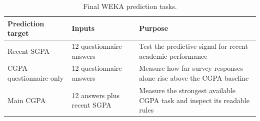 \begin{table}[H]\centering
\caption{Final WEKA prediction tasks.}\label{tab:tree-tasks}
\begin{tabularx}{\textwidth}{p{}p{}Y}\toprule
Prediction target&Inputs&Purpose\\\midrule
Recent SGPA&12 questionnaire answers&Test the predictive signal for recent academic performance\\
CGPA questionnaire-only&12 questionnaire answers&Measure how far survey responses alone rise above the CGPA baseline\\
Main CGPA&12 answers plus recent SGPA&Measure the strongest available CGPA task and inspect its readable rules\\\bottomrule
\end{tabularx}
\end{table}
